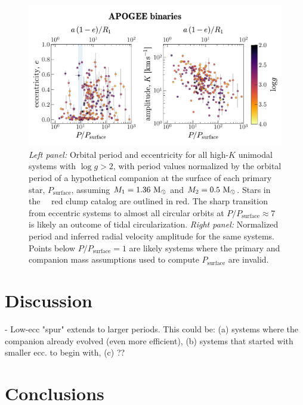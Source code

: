\documentclass[modern, letterpaper]{aastex62}
\newcommand{\apogee}{\project{\acronym{APOGEE}}}
\newcommand{\DR}{\acronym{DR14}}
\begin{document}
\begin{figure}[h]
\begin{center}
\includegraphics[width=\textwidth]{P-e-K}
\end{center}
\caption{%
\textit{Left panel:} Orbital period and eccentricity for all high-$K$ unimodal
systems with $\log g > 2$, with period values normalized by the orbital period
of a hypothetical companion at the surface of each primary star,
$P_{\textrm{surface}}$, assuming $M_1 = 1.36~\mathrm{M}_\odot$ and $M_2 =0.5~\mathrm{M}_\odot$.
Stars in the \apogee\ \DR\ red clump catalog are outlined in red.
The sharp transition from eccentric systems to almost all circular orbits at
$P/P_\textrm{surface} \approx 7$ is likely an outcome of tidal circularization.
\textit{Right panel:} Normalized period and inferred radial velocity amplitude
for the same systems.
Points below $P/P_\textrm{surface} = 1$ are likely systems where the primary and
companion mass assumptions used to compute $P_\textrm{surface}$ are invalid.
\label{fig:PeK}
}
\end{figure}


\section{Discussion} \label{sec:discussion}

- Low-ecc "spur" extends to larger periods. This could be: (a) systems where the companion already evolved (even more efficient), (b) systems that started with smaller ecc. to begin with, (c) ??


\section{Conclusions}



\acknowledgements
\end{document}
